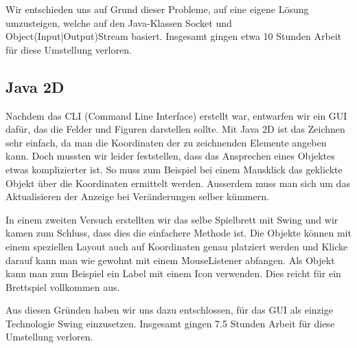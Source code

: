 \documentclass[12pt,halfparskip]{scrartcl}
\begin{document}
Wir entschieden uns auf Grund dieser Probleme, auf eine eigene Lösung umzusteigen, welche auf den Java-Klassen Socket und Object(Input|Output)Stream basiert. Insgesamt gingen etwa 10 Stunden Arbeit für diese Umstellung verloren.

\subsection{Java 2D} %
\label{java_2d}

Nachdem das CLI (Command Line Interface) erstellt war, entwarfen wir ein GUI dafür, das die Felder und Figuren darstellen sollte. Mit Java 2D ist das Zeichnen sehr einfach, da man die Koordinaten der zu zeichnenden Elemente angeben kann. Doch mussten wir leider feststellen, dass das Ansprechen eines Objektes etwas komplizierter ist. So muss zum Beispiel bei einem Mausklick das geklickte Objekt über die Koordinaten ermittelt werden. Ausserdem muss man sich um das Aktualisieren der Anzeige bei Veränderungen selber kümmern.

In einem zweiten Versuch erstellten wir das selbe Spielbrett mit Swing und wir kamen zum Schluss, dass dies die einfachere Methode ist. Die Objekte können mit einem speziellen Layout auch auf Koordinaten genau platziert werden und Klicke darauf kann man wie gewohnt mit einem MouseListener abfangen. Als Objekt kann man zum Beispiel ein Label mit einem Icon verwenden. Dies reicht für ein Brettspiel vollkommen aus.

Aus diesen Gründen haben wir uns dazu entschlossen, für das GUI als einzige Technologie Swing einzusetzen. Insgesamt gingen 7.5 Stunden Arbeit für diese Umstellung verloren.


\end{document}

